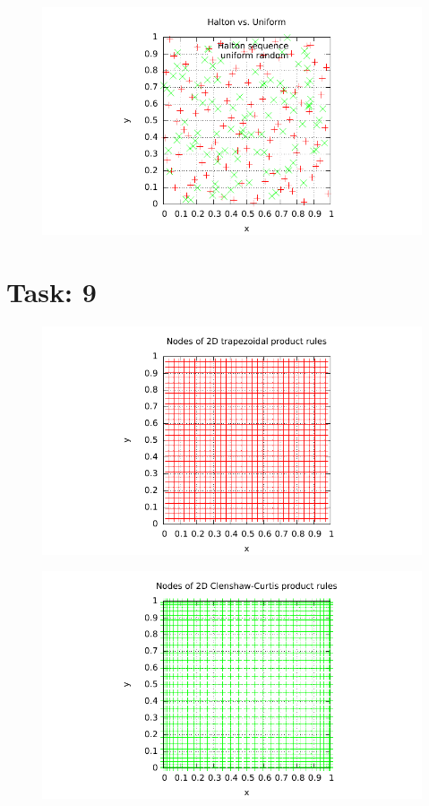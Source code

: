 \documentclass{article}
\begin{document}
\begin{figure}[htbp]
  \centering
     \includegraphics[width=1.0\textwidth]{../Task07/sh3_task7_point_plot.pdf}
\end{figure}

\section*{Task: 9}

\begin{figure}[htbp]
  \centering
     \includegraphics[width=1.0\textwidth]{../Task09/sh3_task9_point_plot_trapezoidal.pdf}
\end{figure}
\newpage
\begin{figure}[htbp]
  \centering
     \includegraphics[width=1.0\textwidth]{../Task09/sh3_task9_point_plot_clenshawCurtis.pdf}
\end{figure}
\end{document}

